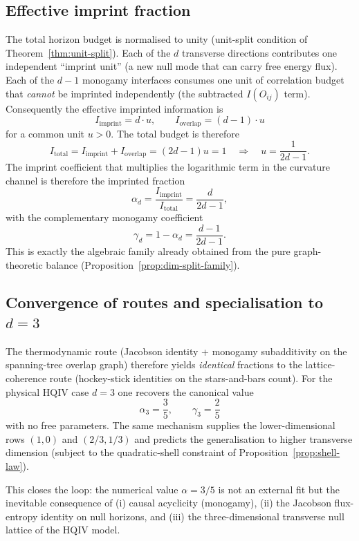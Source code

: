 \documentclass[11pt]{amsart}
\begin{document}
\subsection{Effective imprint fraction}

The total horizon budget is normalised to unity (unit-split condition of Theorem~\ref{thm:unit-split}). Each of the \(d\) transverse directions contributes one independent ``imprint unit'' (a new null mode that can carry free energy flux). Each of the \(d-1\) monogamy interfaces consumes one unit of correlation budget that \emph{cannot} be imprinted independently (the subtracted \(I(O_{ij})\) term). Consequently the effective imprinted information is
\[
I_{\mathrm{imprint}}=d\cdot u,\qquad I_{\mathrm{overlap}}=(d-1)\cdot u
\]
for a common unit \(u>0\). The total budget is therefore
\[
I_{\mathrm{total}}=I_{\mathrm{imprint}}+I_{\mathrm{overlap}}=(2d-1)u=1\quad\Rightarrow\quad u=\frac{1}{2d-1}.
\]
The imprint coefficient that multiplies the logarithmic term in the curvature channel is therefore the imprinted fraction
\[
\alpha_d=\frac{I_{\mathrm{imprint}}}{I_{\mathrm{total}}}=\frac{d}{2d-1},
\]
with the complementary monogamy coefficient
\[
\gamma_d=1-\alpha_d=\frac{d-1}{2d-1}.
\]
This is exactly the algebraic family already obtained from the pure graph-theoretic balance (Proposition~\ref{prop:dim-split-family}).

\subsection{Convergence of routes and specialisation to \texorpdfstring{\(d=3\)}{d=3}}

The thermodynamic route (Jacobson identity + monogamy subadditivity on the spanning-tree overlap graph) therefore yields \emph{identical} fractions to the lattice-coherence route (hockey-stick identities on the stars-and-bars count). For the physical HQIV case \(d=3\) one recovers the canonical value
\[
\alpha_3=\frac{3}{5},\qquad\gamma_3=\frac{2}{5}
\]
with no free parameters. The same mechanism supplies the lower-dimensional rows \((1,0)\) and \((2/3,1/3)\) and predicts the generalisation to higher transverse dimension (subject to the quadratic-shell constraint of Proposition~\ref{prop:shell-law}).

This closes the loop: the numerical value \(\alpha=3/5\) is not an external fit but the inevitable consequence of (i) causal acyclicity (monogamy), (ii) the Jacobson flux-entropy identity on null horizons, and (iii) the three-dimensional transverse null lattice of the HQIV model.
\end{document}
